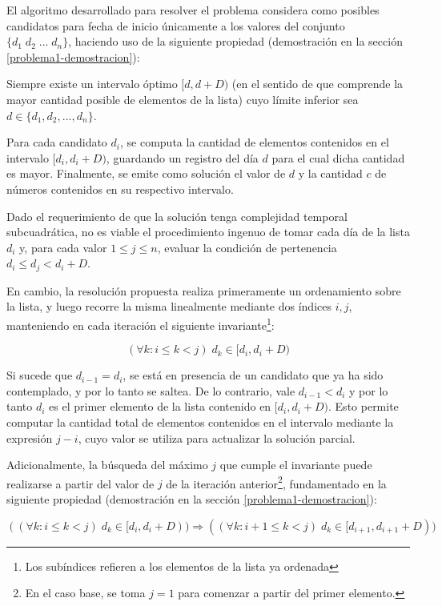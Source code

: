 El algoritmo desarrollado para resolver el problema considera como posibles candidatos para fecha de inicio únicamente a los valores del conjunto $\{d_1\;d_2\;...\;d_n\}$, haciendo uso de la siguiente propiedad (demostración en la sección \ref{problema1-demostracion}):

\begin{propiedad}\label{propiedad-candidatos}
Siempre existe un intervalo óptimo $[d, d + D)$ (en el sentido de que comprende la mayor cantidad posible de elementos de la lista) cuyo límite inferior sea $d \in \{d_1,d_2,...,d_n\}$.
\end{propiedad}

Para cada candidato $d_i$, se computa la cantidad de elementos contenidos en el intervalo $[d_i, d_i + D)$, guardando un registro del día $d$ para el cual dicha cantidad es mayor. Finalmente, se emite como solución el valor de $d$ y la cantidad $c$ de números contenidos en su respectivo intervalo.

Dado el requerimiento de que la solución tenga complejidad temporal subcuadrática, no es viable el procedimiento ingenuo de tomar cada día de la lista $d_i$ y, para cada valor $1 \leq j \leq n$, evaluar la condición de pertenencia $d_i \leq d_j < d_i + D$.

En cambio, la resolución propuesta realiza primeramente un ordenamiento sobre la lista, y luego recorre la misma linealmente mediante dos índices $i,j$, manteniendo en cada iteración el siguiente invariante\footnote{Los subíndices refieren a los elementos de la lista ya ordenada}:

$$(\forall k: i \leq k < j)\;d_k \in [d_i, d_i + D)$$

Si sucede que $d_{i-1} = d_i$, se está en presencia de un candidato que ya ha sido contemplado, y por lo tanto se saltea. De lo contrario, vale $d_{i-1} < d_i$ y por lo tanto $d_i$ es el primer elemento de la lista contenido en $[d_i, d_i + D)$. Esto permite computar la cantidad total de elementos contenidos en el intervalo mediante la expresión $j - i$, cuyo valor se utiliza para actualizar la solución parcial.

Adicionalmente, la búsqueda del máximo $j$ que cumple el invariante puede realizarse a partir del valor de $j$ de la iteración anterior\footnote{En el caso base, se toma $j = 1$ para comenzar a partir del primer elemento.}, fundamentado en la siguiente propiedad (demostración en la sección \ref{problema1-demostracion}):

\begin{propiedad}\label{propiedad-maximo-j}
$$((\forall k: i \leq k < j)\;d_k \in [d_i, d_i + D)) \Rightarrow ((\forall k: i + 1 \leq k < j)\;d_k \in [d_{i+1}, d_{i+1} + D))$$
\end{propiedad}

